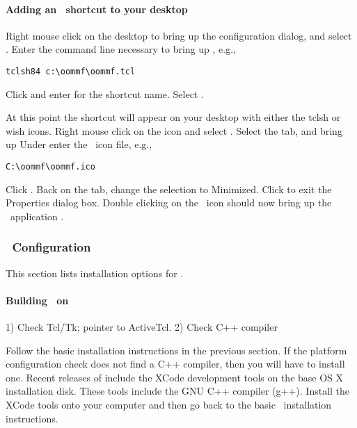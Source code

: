 \paragraph{Adding an \OOMMF\ shortcut to your desktop}

Right mouse click on the desktop to bring up the configuration dialog,
and select .  
Enter the command line necessary to bring up \OOMMF, e.g.,
\begin{verbatim}
tclsh84 c:\oommf\oommf.tcl
\end{verbatim}

Click  and enter  for the shortcut name.  
Select .

At this point the shortcut will appear on your desktop with either the
tclsh or wish icons.  Right mouse click on the icon and select
.  Select the  tab, 
and bring up   Under  enter the
\OOMMF\ icon file, e.g.,
\begin{verbatim}
C:\oommf\oommf.ico
\end{verbatim}

Click .  Back on the  tab, change the 
 selection to
Minimized.  Click  to exit the Properties dialog box.  Double
clicking on the \OOMMF\ icon should now bring up the 
\OOMMF\ application .

\subsubsection{\MacOSX\ Configuration}\label{sec:install.macosx}

This section lists installation options for \MacOSX.

\paragraph{Building \OOMMF\ on \MacOSX}

1) Check Tcl/Tk; pointer to ActiveTcl.
2) Check C++ compiler

Follow the basic installation instructions in the previous section.  If
the platform configuration check does not find a C++ compiler, then you
will have to install one.  Recent releases of \MacOSX include the XCode
development tools on the base OS X installation disk.  These tools
include the GNU C++ compiler (g++).  Install the XCode tools onto your
computer and then go back to the basic \OOMMF\ installation instructions.

